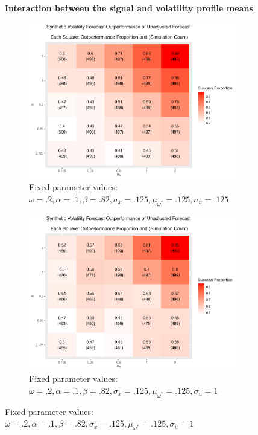 \documentclass[11pt,3p,review,authoryear]{elsarticle}
\theoremstyle{definition}
\begin{document}
  \begin{figure}[!h]
    \centering
    \textbf{Interaction between the signal and volatility profile means}\par\medskip
  \begin{subfigure}{.44\linewidth} 
    \centering
      \includegraphics[scale = .42]{simulation_plots/Jun06_234115_2024_delta_mu[x].png}
      \caption{Fixed parameter values: $\omega = .2, \alpha = .1, \beta = .82,  \sigma_{x} = .125, \mu_{\omega^{*}} = .125, \sigma_{u} = .125$}\label{fig:sim_4}
  \end{subfigure}\hspace{12mm} %
  \begin{subfigure}{.44\linewidth} 
    \centering
      \includegraphics[scale=.42]{simulation_plots/Jun06_234119_2024_delta_mu[x].png}
      \caption{Fixed parameter values: $\omega = .2, \alpha = .1, \beta = .82, \sigma_{x} = .125, \mu_{\omega^{*}} = .125, \sigma_{u} = 1$}\label{fig:sim_5}
  \end{subfigure}
  

\end{figure}
\end{document}
